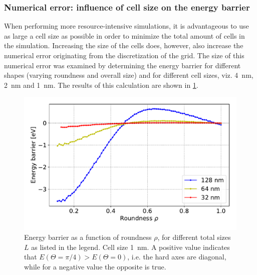 \documentclass[11pt,a4paper,english]{article}
\begin{document}
\subsubsection{Numerical error: influence of cell size on the energy barrier}
When performing more resource-intensive simulations, it is advantageous to use as large a cell size as possible in order to minimize the total amount of cells in the simulation. Increasing the size of the cells does, however, also increase the numerical error originating from the discretization of the grid. The size of this numerical error was examined by determining the energy barrier for different shapes (varying roundness and overall size) and for different cell sizes, viz. \SI{4}{\nano\metre}, \SI{2}{\nano\metre} and \SI{1}{\nano\metre}. The results of this calculation are shown in \cref{fig:barrier-cell_size}. \par
\begin{figure}
    \centering
    \includegraphics[width=0.9\columnwidth]{Figures/biaxial_island/Barrier/Plus_32,64,128_0.1-1_aPi128_B0.01_cell1nm.pdf}
    \caption{Energy barrier as a function of roundness $\rho$, for different total sizes $L$ as listed in the legend. Cell size \SI{1}{\nano\metre}. A positive value indicates that $E(\Theta=\pi/4) > E(\Theta=0)$, i.e. the hard axes are diagonal, while for a negative value the opposite is true.}
    \label{fig:barrier-cell_size}
\end{figure}
\end{document}
